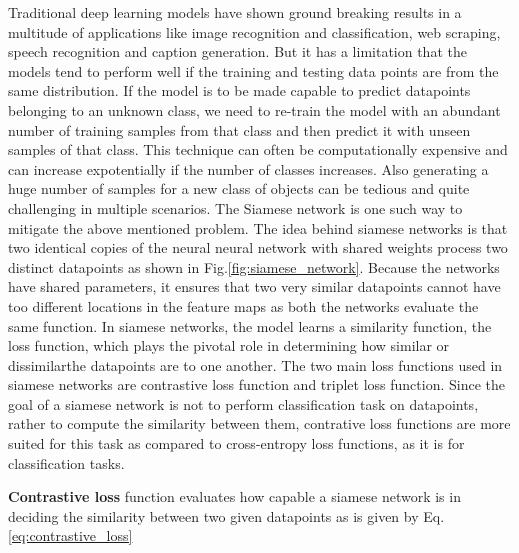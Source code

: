 Traditional deep learning models have shown ground breaking results in a multitude of applications like image recognition and classification, web scraping, speech recognition and caption generation. But it has a limitation that the models tend to perform well if the training and testing data points are from the same distribution. If the model is to be made capable to predict datapoints belonging to an unknown class, we need to re-train the model with an abundant number of training samples from that class and then predict it with unseen samples of that class. This technique can often be computationally expensive and can increase expotentially if the number of classes increases. Also generating a huge number of samples for a new class of objects can be tedious and quite challenging in multiple scenarios. The Siamese network\cite*{koch2015siamese,bromley1993signature} is one such way to mitigate the above mentioned problem. The idea behind siamese networks is that two identical copies of the neural neural network with shared weights process two distinct datapoints as shown in Fig.\ref*{fig:siamese_network}. Because the networks have shared parameters, it ensures that two very similar datapoints cannot have too different locations in the feature maps as both the networks evaluate the same function. In siamese networks, the model learns a similarity function, the loss function, which plays the pivotal role in determining how similar or dissimilarthe datapoints are to one another. The two main loss functions used in siamese networks are contrastive loss function\cite*{bromley1993signature} and triplet loss function\cite*{balntas2016learning}. Since the goal of a siamese network is not to perform classification task on datapoints, rather to compute the similarity between them, contrative loss functions are more suited for this task as compared to cross-entropy loss functions, as it is for classification tasks.

\vspace{5mm}

\textbf{Contrastive loss} function evaluates how capable a siamese network is in deciding the similarity between two given datapoints as is given by Eq.\ref*{eq:contrastive_loss}\cite*{siamese_network}

